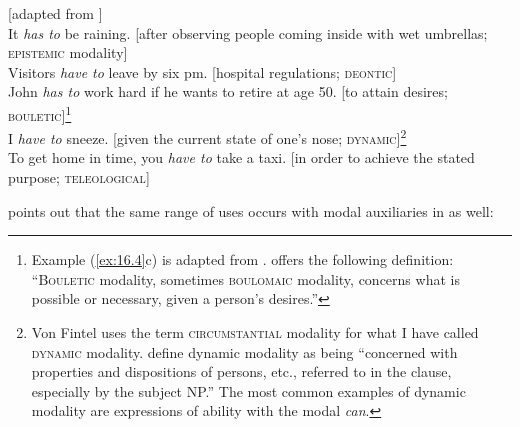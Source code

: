 \ea \label{ex:16.4}
{}[adapted from \citealt{vonFintel2006}]\\
\ea  It \textit{has to} be raining. [after observing people coming inside with wet umbrellas; \textsc{epistemic} modality]\\
\ex Visitors \textit{have to} leave by six pm. [hospital regulations; \textsc{deontic}]\\
\ex John \textit{has to} work hard if he wants to retire at age 50. [to attain desires; \textsc{bouletic}]\footnote{Example (\ref{ex:16.4}c) is adapted from \citet{Hacquard2011}.  offers the following definition: “\textsc{Bouletic} modality, sometimes \textsc{boulomaic} modality, concerns what is possible or necessary, given a person’s desires.”}\\
\ex I \textit{have to} sneeze. [given the current state of one’s nose; \textsc{dynamic}]\footnote{Von Fintel uses the term \textsc{circumstantial} modality for what I have called \textsc{dynamic} modality.    \citet[178]{HuddlestonPullum2002} define dynamic modality as being “concerned with properties and dispositions of persons, etc., referred to in the clause, especially by the subject NP.” The most common examples of dynamic modality are expressions of ability with the modal \textit{can}.}\\
\ex To get home in time, you \textit{have to} take a taxi. [in order to achieve the stated purpose;   \textsc{teleological}]
\z \z


\citet{Hacquard2007} points out that the same range of uses occurs with modal auxiliaries in  as well:


